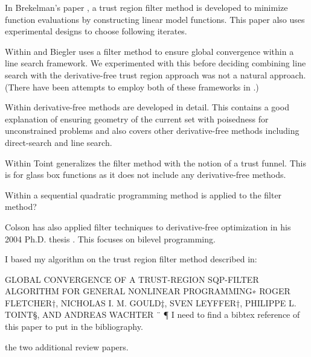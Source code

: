 \documentclass{article}
\begin{document}
In Brekelman's paper \cite{DUMMY:Brekelman}, a trust region filter method is developed to minimize function evaluations by constructing linear model functions.
This paper also uses experimental designs to choose following iterates.


Within \cite{DUMMY:linesearch_global} and \cite{DUMMY:linesearch_local} Biegler uses a filter method to ensure global convergence within a line search framework.
We experimented with this before deciding combining line search with the derivative-free trust region approach was not a natural approach. (There have been attempts to employ both of these frameworks in \cite{DUMMY:CombineTrustAndLine}.)


Within  \cite{DUMMY:intro_book} derivative-free methods are developed in detail.
This contains a good explanation of ensuring geometry of the current set with poisedness for unconstrained problems and also covers other derivative-free methods including direct-search and line search.


Within \cite{DUMMY:trust_funnel_dfo} Toint generalizes the filter method with the notion of a trust funnel.
This is for glass box functions as it does not include any derivative-free methods.


Within \cite{DUMMY:sqp_filter} a sequential quadratic programming method is applied to the filter method?


Colson has also applied filter techniques to derivative-free optimization in his 2004 Ph.D. thesis \cite{Colson2004}.
This focuses on bilevel programming.


I based my algorithm on the trust region filter method described in:

GLOBAL CONVERGENCE OF A TRUST-REGION SQP-FILTER
ALGORITHM FOR GENERAL NONLINEAR PROGRAMMING∗
ROGER FLETCHER†, NICHOLAS I. M. GOULD‡, SVEN LEYFFER†,
PHILIPPE L. TOINT§, AND ANDREAS WACHTER ¨ ¶
I need to find a bibtex reference of this paper to put in the bibliography.




the two additional review papers.
\end{document}
